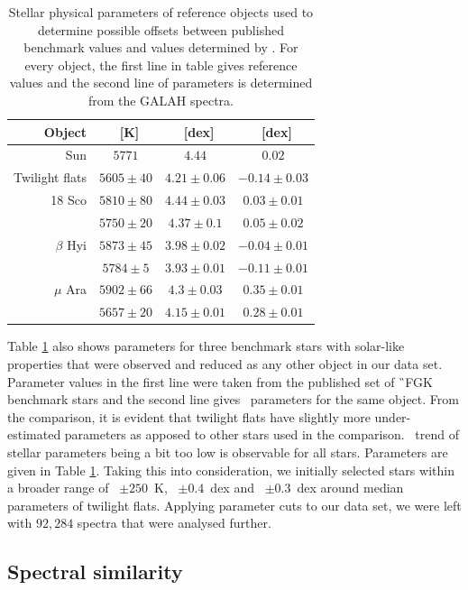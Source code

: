 \begin{table}
	\centering
	\caption{Stellar physical parameters of reference objects used to determine possible offsets between published benchmark values and values determined by \TC. For every object, the first line in table gives reference values and the second line of parameters is determined from the GALAH spectra.}
	\label{tab:params_twins}
	\begin{tabular}{r c c c}
		\hline
		Object & \Teff\ [K] & \Logg\ [dex] & \Feh\ [dex] \\ 
		\hline \hline
		Sun & $5771$ & $4.44$ & $0.02$ \\ 
		Twilight flats & $5605 \pm 40$ & $4.21 \pm 0.06$ & $-0.14 \pm 0.03$ \\ 
		\hline
		18 Sco & $5810 \pm 80$ & $4.44 \pm 0.03$ & $0.03 \pm 0.01$ \\
		& $5750 \pm 20 $ & $4.37 \pm 0.1$ & $ 0.05 \pm 0.02$ \\ 
		\hline
		$\beta$ Hyi & $5873 \pm 45$ & $3.98 \pm 0.02$ & $-0.04 \pm 0.01$ \\
		& $5784 \pm 5$ & $3.93 \pm 0.01$ & $-0.11 \pm 0.01$ \\ 
		\hline
		$\mu$ Ara & $5902 \pm 66$ & $4.3 \pm 0.03$ & $0.35 \pm 0.01$ \\
		& $5657 \pm 20$ & $4.15 \pm 0.01$ & $0.28 \pm 0.01$ \\
		\hline
	\end{tabular}
\end{table}

Table \ref{tab:params_twins} also shows parameters for three benchmark stars with solar-like properties that were observed and reduced as any other object in our data set. Parameter values in the first line were taken from the published set of \G\ FGK benchmark stars \cite{2014A&A...564A.133J, 2015A&A...582A..49H} and the second line gives \TC\ parameters for the same object. From the comparison, it is evident that twilight flats have slightly more under-estimated parameters as apposed to other stars used in the comparison. \TC\ trend of stellar parameters being a bit too low is observable for all stars. Parameters are given in Table \ref{tab:params_twins}. Taking this into consideration, we initially selected stars within a broader range of \Teff~$\pm 250 $~K, \Logg~$\pm 0.4$~dex and \Feh~$\pm 0.3 $~dex around median parameters of twilight flats. Applying parameter cuts to our data set, we were left with $92,284$ spectra that were analysed further.

\subsection{Spectral similarity}
\label{sec:spec_comp_twins}

